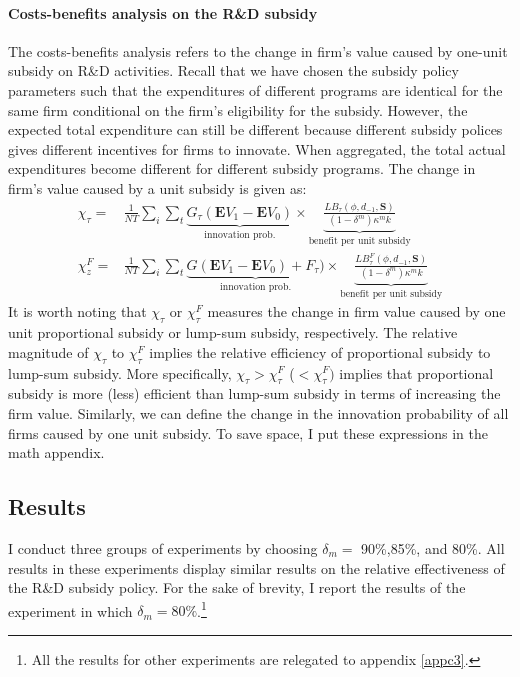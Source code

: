 \documentclass[English]{article}
\begin{document}
\paragraph{Costs-benefits analysis on the R\&D subsidy} The costs-benefits analysis refers to the change in firm's value caused by one-unit subsidy on R\&D activities. Recall that we have chosen the subsidy policy parameters such that the expenditures of different programs are identical for the same firm conditional on the firm's eligibility for the subsidy. However, the expected total expenditure can still be different because different subsidy polices gives different incentives for firms to innovate. When aggregated, the total actual expenditures become different for different subsidy programs. The change in firm's value caused by a unit subsidy is given as:
\begin{align}
\chi_\tau=&\frac{1}{NT}\sum_i \sum_t \underbrace{G_\tau(\mathbf{E}V_1-\mathbf{E}V_0)}_\text{innovation prob.}\times \underbrace{\frac{LB_{\tau}(\phi, d_{-1}, \mathbf{S})}{(1-\delta^m)\kappa^m k}}_\text{benefit per unit subsidy}\\\label{xz}
\chi_z^F=&\frac{1}{NT}\sum_i\sum_t \underbrace{G(\mathbf{E}V_1-\mathbf{E}V_0)+F_{\tau})}_\text{innovation prob.}\times \underbrace{\frac{LB_{\tau}^F(\phi, d_{-1}, \mathbf{S})}{(1-\delta^m)\kappa^m k}}_\text{benefit per unit subsidy}\label{xzf}
\end{align}
 It is worth noting that $\chi_\tau$ or $\chi_\tau^F$ measures the change in firm value caused by one unit proportional subsidy or lump-sum subsidy, respectively. The relative magnitude of $\chi_\tau$ to $\chi_\tau^F$ implies the relative efficiency of proportional subsidy to lump-sum subsidy. More specifically, $\chi_\tau>\chi_\tau^F$ ($<\chi_\tau^F)$ implies that proportional subsidy is more (less) efficient than lump-sum subsidy in terms of increasing the firm value. Similarly, we can define the change in the innovation probability of all firms caused by one unit subsidy. To save space, I put these expressions in the math appendix. 

\subsection{Results} 
I conduct three groups of experiments by choosing $\delta_{m}=$ 90\%,85\%, and 80\%. All results in these experiments display similar results on the relative effectiveness of the R\&D subsidy policy. For the sake of brevity, I report the results of the experiment in which $\delta_{m}=80\%$.\footnote{All the results for other experiments are relegated to appendix \ref{appc3}.} 
\end{document}
